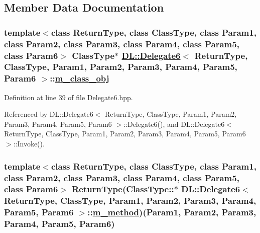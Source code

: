 \subsection{Member Data Documentation}
\hypertarget{classDL_1_1Delegate6_r0}{
\subsubsection[m\_\-class\_\-obj]{\setlength{\rightskip}{0pt plus 5cm}template$<$class Return\-Type, class Class\-Type, class Param1, class Param2, class Param3, class Param4, class Param5, class Param6$>$ Class\-Type$\ast$ \hyperlink{classDL_1_1Delegate6}{DL::Delegate6}$<$ Return\-Type, Class\-Type, Param1, Param2, Param3, Param4, Param5, Param6 $>$::\hyperlink{classDL_1_1Delegate6_r0}{m\_\-class\_\-obj}}}
\label{classDL_1_1Delegate6_r0}




Definition at line 39 of file Delegate6.hpp.

Referenced by DL::Delegate6$<$ Return\-Type, Class\-Type, Param1, Param2, Param3, Param4, Param5, Param6 $>$::Delegate6(), and DL::Delegate6$<$ Return\-Type, Class\-Type, Param1, Param2, Param3, Param4, Param5, Param6 $>$::Invoke().\hypertarget{classDL_1_1Delegate6_r1}{
\subsubsection[m\_\-method]{\setlength{\rightskip}{0pt plus 5cm}template$<$class Return\-Type, class Class\-Type, class Param1, class Param2, class Param3, class Param4, class Param5, class Param6$>$ Return\-Type(Class\-Type::$\ast$ \hyperlink{classDL_1_1Delegate6}{DL::Delegate6}$<$ Return\-Type, Class\-Type, Param1, Param2, Param3, Param4, Param5, Param6 $>$::\hyperlink{classDL_1_1Delegate6_r1}{m\_\-method})(Param1, Param2, Param3, Param4, Param5, Param6)}}
\label{classDL_1_1Delegate6_r1}




